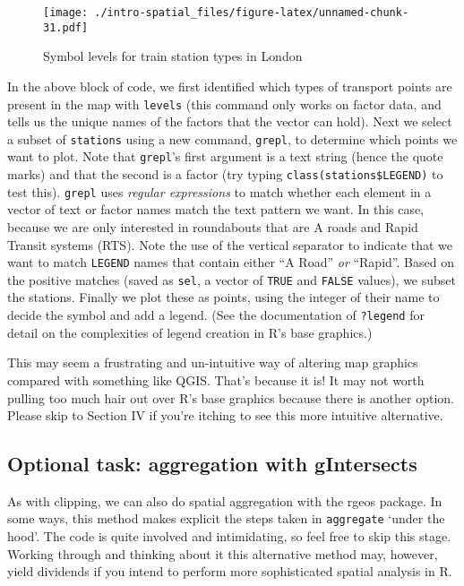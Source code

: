 \documentclass[]{article}
\begin{document}
\begin{figure}[htbp]
\centering
\texttt{[image: ./intro-spatial\_files/figure-latex/unnamed-chunk-31.pdf]}
\caption{Symbol levels for train station types in London}
\end{figure}

In the above block of code, we first identified which types of transport
points are present in the map with \texttt{levels} (this command only
works on factor data, and tells us the unique names of the factors that
the vector can hold). Next we select a subset of \texttt{stations} using
a new command, \texttt{grepl}, to determine which points we want to
plot. Note that \texttt{grepl}'s first argument is a text string (hence
the quote marks) and that the second is a factor (try typing
\texttt{class(stations\$LEGEND)} to test this). \texttt{grepl} uses
\emph{regular expressions} to match whether each element in a vector of
text or factor names match the text pattern we want. In this case,
because we are only interested in roundabouts that are A roads and Rapid
Transit systems (RTS). Note the use of the vertical separator
\texttt{\textbar{}} to indicate that we want to match \texttt{LEGEND}
names that contain either ``A Road'' \emph{or} ``Rapid''. Based on the
positive matches (saved as \texttt{sel}, a vector of \texttt{TRUE} and
\texttt{FALSE} values), we subset the stations. Finally we plot these as
points, using the integer of their name to decide the symbol and add a
legend. (See the documentation of \texttt{?legend} for detail on the
complexities of legend creation in R's base graphics.)

This may seem a frustrating and un-intuitive way of altering map
graphics compared with something like QGIS. That's because it is! It may
not worth pulling too much hair out over R's base graphics because there
is another option. Please skip to Section IV if you're itching to see
this more intuitive alternative.

\subsection{Optional task: aggregation with
gIntersects}\label{optional-task-aggregation-with-gintersects}

As with clipping, we can also do spatial aggregation with the rgeos
package. In some ways, this method makes explicit the steps taken in
\texttt{aggregate} `under the hood'. The code is quite involved and
intimidating, so feel free to skip this stage. Working through and
thinking about it this alternative method may, however, yield dividends
if you intend to perform more sophisticated spatial analysis in R.
\end{document}
